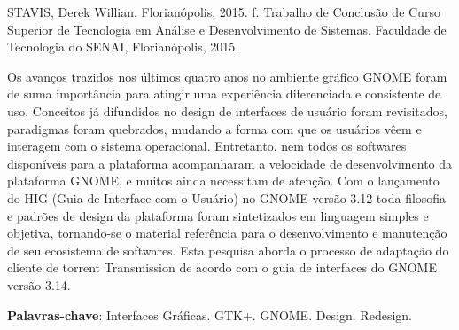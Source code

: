 \noindent STAVIS, Derek Willian. \textbf{\imprimirtitulo} Florianópolis, 2015.
\pageref{nropaginas}f. Trabalho de Conclusão de Curso Superior de Tecnologia em
Análise e Desenvolvimento de Sistemas. Faculdade de Tecnologia do SENAI,
Florianópolis, 2015.

\vspace{1cm}
\setlength{\absparsep}{18pt} %
\begin{resumo}

  Os avanços trazidos nos últimos quatro anos no ambiente gráfico GNOME foram de
  suma importância para atingir uma experiência diferenciada e consistente de
  uso. Conceitos já difundidos no design de interfaces de usuário foram
  revisitados, paradigmas foram quebrados, mudando a forma com que os usuários
  vêem e interagem com o sistema operacional. Entretanto, nem todos os softwares
  disponíveis para a plataforma acompanharam a velocidade de desenvolvimento da
  plataforma GNOME, e muitos ainda necessitam de atenção. Com o lançamento do
  HIG (Guia de Interface com o Usuário) no GNOME versão 3.12 toda filosofia e
  padrões de design da plataforma foram sintetizados em linguagem simples e
  objetiva, tornando-se o material referência para o desenvolvimento e
  manutenção de seu ecosistema de softwares. Esta pesquisa aborda o processo de
  adaptação do cliente de torrent Transmission de acordo com o guia de
  interfaces do GNOME versão 3.14.

  \vspace{\onelineskip}

  \noindent
  \textbf{Palavras-chave}: Interfaces Gráficas. GTK+. GNOME. Design. Redesign.

\end{resumo}
